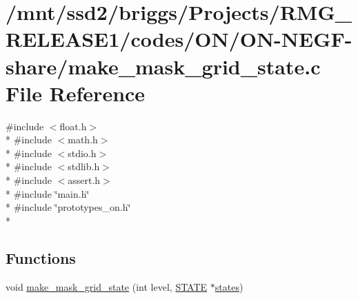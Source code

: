 \hypertarget{_o_n_2_o_n-_n_e_g_f-share_2make__mask__grid__state_8c}{\section{/mnt/ssd2/briggs/\-Projects/\-R\-M\-G\-\_\-\-R\-E\-L\-E\-A\-S\-E1/codes/\-O\-N/\-O\-N-\/\-N\-E\-G\-F-\/share/make\-\_\-mask\-\_\-grid\-\_\-state.c File Reference}
\label{_o_n_2_o_n-_n_e_g_f-share_2make__mask__grid__state_8c}
}
{\ttfamily \#include $<$float.\-h$>$}\\*
{\ttfamily \#include $<$math.\-h$>$}\\*
{\ttfamily \#include $<$stdio.\-h$>$}\\*
{\ttfamily \#include $<$stdlib.\-h$>$}\\*
{\ttfamily \#include $<$assert.\-h$>$}\\*
{\ttfamily \#include \char`\"{}main.\-h\char`\"{}}\\*
{\ttfamily \#include \char`\"{}prototypes\-\_\-on.\-h\char`\"{}}\\*
\subsection*{Functions}
\begin{DoxyCompactItemize}
\item 
void \hyperlink{_o_n_2_o_n-_n_e_g_f-share_2make__mask__grid__state_8c_ae2ef57cf235a2dadd0d26631747fb624}{make\-\_\-mask\-\_\-grid\-\_\-state} (int level, \hyperlink{struct_s_t_a_t_e}{S\-T\-A\-T\-E} $\ast$\hyperlink{md_8h_a286ebf6b996d2b1827eb9a889dfc83d7}{states})
\end{DoxyCompactItemize}



